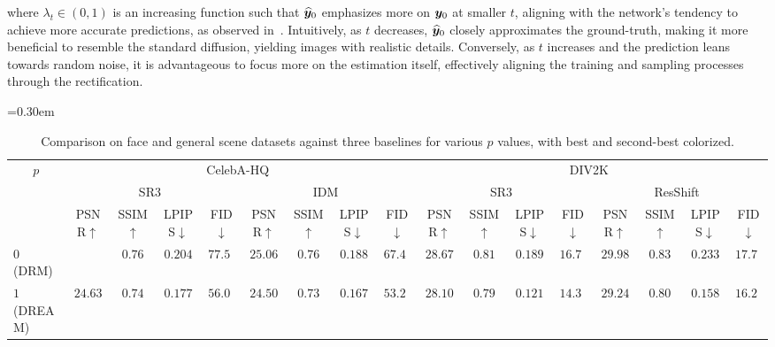 \noindent
where $\lambda_t\in(0,1)$ is an increasing function such that $\widehat{{\bm{y}}}_0$ emphasizes more on ${\bm{y}}_0$ at smaller $t$, aligning with the network's tendency to achieve more accurate predictions, as observed in~. Intuitively, as $t$ decreases, $\widehat{{\bm{y}}}_0$ closely approximates the ground-truth, making it more beneficial to resemble the standard diffusion, yielding images with realistic details. Conversely, as $t$ increases and the prediction leans towards random noise, it is advantageous to focus more on the estimation itself, effectively aligning the training and sampling processes through the rectification.

\begin{table*}[t]
\centering
\caption{Comparison  on face and general scene datasets against three baselines for various $p$ values, with  \colorbox{red!20}{best} and \colorbox{orange!20}{second-best} colorized.}
\vspace{-.1in}
\label{tab:face-sr3-peffect}
\footnotesize
\tabcolsep=0.30em
\begin{tabular}{ccccccccc|cccccccc}
\toprule
\multirow{3}{*}{$p$} & \multicolumn{8}{c|}{CelebA-HQ~\cite{karras2017progressive}} & \multicolumn{8}{c}{DIV2K~\cite{agustsson2017ntire}} \\ \cmidrule(lr){2-17} 
 & \multicolumn{4}{c|}{SR3~\cite{saharia2022image}} & \multicolumn{4}{c|}{IDM~\cite{gao2023implicit}} & \multicolumn{4}{c|}{SR3~\cite{saharia2022image}} & \multicolumn{4}{c}{ResShift~\cite{yue2023resshift}} \\ %
 & PSNR$\uparrow$ & SSIM$\uparrow$ & LPIPS$\downarrow$ & \multicolumn{1}{c|}{FID$\downarrow$} & PSNR$\uparrow$ & SSIM$\uparrow$ & LPIPS$\downarrow$ & \multicolumn{1}{c|}{FID$\downarrow$} & PSNR$\uparrow$ & SSIM$\uparrow$ & LPIPS$\downarrow$ & \multicolumn{1}{c|}{FID$\downarrow$} & PSNR$\uparrow$ & SSIM$\uparrow$ & LPIPS$\downarrow$ & FID$\downarrow$ \\ \midrule
\multicolumn{1}{l}{$0$ (DRM)} & \cellcolor{red!20}{$25.04$} & \cellcolor{red!20}$0.76$ & $0.204$ & \multicolumn{1}{c|}{$77.51$} & \cellcolor{red!20}$25.06$ & \cellcolor{red!20}$0.76$ & $0.188$ & $67.46$ & \cellcolor{red!20}$28.67$ & \cellcolor{red!20}$0.81$ & $0.189$ & \multicolumn{1}{c|}{$16.72$} & \cellcolor{red!20}$29.98$ & \cellcolor{red!20}$0.83$ & $0.233$ & $17.76$ \\\midrule
\multicolumn{1}{l}{$1$ (DREAM)} & \cellcolor{orange!20}$24.63$ & \cellcolor{orange!20}$0.74$ & \cellcolor{red!20}$0.177$ & \multicolumn{1}{c|}{ \cellcolor{red!20}$56.01$} & \cellcolor{orange!20}$24.50$ & \cellcolor{orange!20}$0.73$ & \cellcolor{red!20}$0.167$ & \cellcolor{red!20}$53.22$ & \cellcolor{orange!20}$28.10$ & \cellcolor{orange!20}$0.79$ & \cellcolor{red!20}$0.121$ & \multicolumn{1}{c|}{\cellcolor{red!20}$14.32$} & \cellcolor{orange!20}$29.24$ & \cellcolor{orange!20}$0.80$ & $0.158$ & $16.23$ \\

\end{tabular}
\end{table*}
